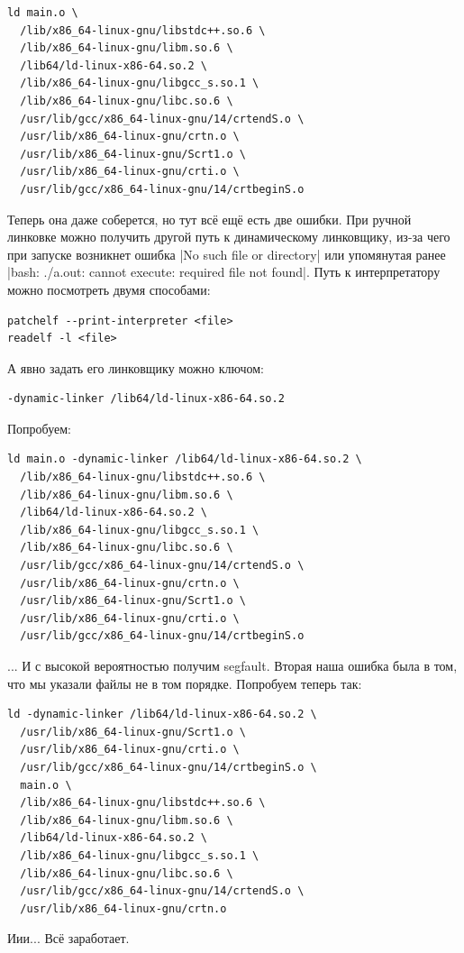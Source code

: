 \documentclass[11pt]{article}
\begin{document}
\begin{lstlisting}
ld main.o \
  /lib/x86_64-linux-gnu/libstdc++.so.6 \
  /lib/x86_64-linux-gnu/libm.so.6 \
  /lib64/ld-linux-x86-64.so.2 \
  /lib/x86_64-linux-gnu/libgcc_s.so.1 \
  /lib/x86_64-linux-gnu/libc.so.6 \
  /usr/lib/gcc/x86_64-linux-gnu/14/crtendS.o \
  /usr/lib/x86_64-linux-gnu/crtn.o \
  /usr/lib/x86_64-linux-gnu/Scrt1.o \
  /usr/lib/x86_64-linux-gnu/crti.o \
  /usr/lib/gcc/x86_64-linux-gnu/14/crtbeginS.o
\end{lstlisting}
Теперь она даже соберется, но тут всё ещё есть две ошибки.
При ручной линковке можно получить другой путь к динамическому линковщику, из-за чего
при запуске возникнет ошибка \nolint|No such file or directory| или упомянутая ранее \nolint|bash: ./a.out: cannot execute: required file not found|. Путь к интерпретатору можно посмотреть
двумя способами:

\begin{lstlisting}
patchelf --print-interpreter <file>
readelf -l <file>
\end{lstlisting}

А явно задать его линковщику можно ключом:

\begin{lstlisting}
-dynamic-linker /lib64/ld-linux-x86-64.so.2
\end{lstlisting}

Попробуем:
\begin{lstlisting}
ld main.o -dynamic-linker /lib64/ld-linux-x86-64.so.2 \
  /lib/x86_64-linux-gnu/libstdc++.so.6 \
  /lib/x86_64-linux-gnu/libm.so.6 \
  /lib64/ld-linux-x86-64.so.2 \
  /lib/x86_64-linux-gnu/libgcc_s.so.1 \
  /lib/x86_64-linux-gnu/libc.so.6 \
  /usr/lib/gcc/x86_64-linux-gnu/14/crtendS.o \
  /usr/lib/x86_64-linux-gnu/crtn.o \
  /usr/lib/x86_64-linux-gnu/Scrt1.o \
  /usr/lib/x86_64-linux-gnu/crti.o \
  /usr/lib/gcc/x86_64-linux-gnu/14/crtbeginS.o
\end{lstlisting}
...
\newpage
И с высокой вероятностью получим segfault.
Вторая наша ошибка была в том, что мы указали файлы не в том порядке. Попробуем теперь так:
\begin{lstlisting}
ld -dynamic-linker /lib64/ld-linux-x86-64.so.2 \
  /usr/lib/x86_64-linux-gnu/Scrt1.o \
  /usr/lib/x86_64-linux-gnu/crti.o \
  /usr/lib/gcc/x86_64-linux-gnu/14/crtbeginS.o \
  main.o \
  /lib/x86_64-linux-gnu/libstdc++.so.6 \
  /lib/x86_64-linux-gnu/libm.so.6 \
  /lib64/ld-linux-x86-64.so.2 \
  /lib/x86_64-linux-gnu/libgcc_s.so.1 \
  /lib/x86_64-linux-gnu/libc.so.6 \
  /usr/lib/gcc/x86_64-linux-gnu/14/crtendS.o \
  /usr/lib/x86_64-linux-gnu/crtn.o
\end{lstlisting}
Иии... Всё заработает.
\end{document}
